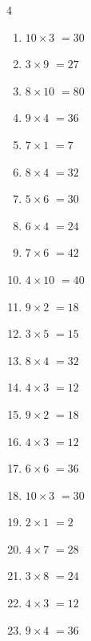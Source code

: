 \begin{multicols}{4}
\begin{enumerate}
  \item $10\times 3$
        $=30$

  \item $3\times 9$
        $=27$

  \item $8\times 10$
        $=80$

  \item $9\times 4$
        $=36$

  \item $7\times 1$
        $=7$

  \item $8\times 4$
        $=32$

  \item $5\times 6$
        $=30$

  \item $6\times 4$
        $=24$

  \item $7\times 6$
        $=42$

  \item $4\times 10$
        $=40$

  \item $9\times 2$
        $=18$

  \item $3\times 5$
        $=15$

  \item $8\times 4$
        $=32$

  \item $4\times 3$
        $=12$

  \item $9\times 2$
        $=18$

  \item $4\times 3$
        $=12$

  \item $6\times 6$
        $=36$

  \item $10\times 3$
        $=30$

  \item $2\times 1$
        $=2$

  \item $4\times 7$
        $=28$

  \item $3\times 8$
        $=24$

  \item $4\times 3$
        $=12$

  \item $9\times 4$
        $=36$


\end{enumerate}
\end{multicols}
